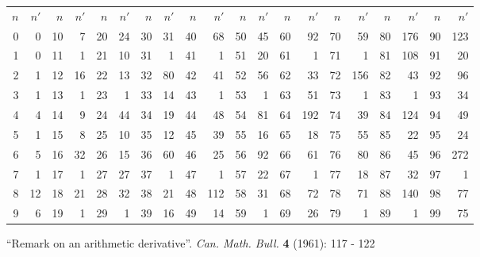 \documentclass[12pt]{article}
\begin{document}
\begin{tabular}{|r|r|r|r|r|r|r|r|r|r|r|r|r|r|r|r|r|r|r|r|}
$n$ & $n'$ & $n$ & $n'$ & $n$ & $n'$ & $n$ & $n'$ & $n$ & $n'$ & $n$ & $n'$ & $n$ & $n'$ & $n$ & $n'$ & $n$ & $n'$ & $n$ & $n'$ \\
0 & 0 & 10 & 7 & 20 & 24 & 30 & 31 & 40 & 68 & 50 & 45 & 60 & 92 & 70 & 59 & 80 & 176 & 90 & 123 \\
1 & 0 & 11 & 1 & 21 & 10 & 31 & 1 & 41 & 1 & 51 & 20 & 61 & 1 & 71 & 1 & 81 & 108 & 91 & 20 \\
2 & 1 & 12 & 16 & 22 & 13 & 32 & 80 & 42 & 41 & 52 & 56 & 62 & 33 & 72 & 156 & 82 & 43 & 92 & 96 \\
3 & 1 & 13 & 1 & 23 & 1 & 33 & 14 & 43 & 1 & 53 & 1 & 63 & 51 & 73 & 1 & 83 & 1 & 93 & 34 \\
4 & 4 & 14 & 9 & 24 & 44 & 34 & 19 & 44 & 48 & 54 & 81 & 64 & 192 & 74 & 39 & 84 & 124 & 94 & 49 \\
5 & 1 & 15 & 8 & 25 & 10 & 35 & 12 & 45 & 39 & 55 & 16 & 65 & 18 & 75 & 55 & 85 & 22 & 95 & 24 \\
6 & 5 & 16 & 32 & 26 & 15 & 36 & 60 & 46 & 25 & 56 & 92 & 66 & 61 & 76 & 80 & 86 & 45 & 96 & 272 \\
7 & 1 & 17 & 1 & 27 & 27 & 37 & 1 & 47 & 1 & 57 & 22 & 67 & 1 & 77 & 18 & 87 & 32 & 97 & 1 \\
8 & 12 & 18 & 21 & 28 & 32 & 38 & 21 & 48 & 112 & 58 & 31 & 68 & 72 & 78 & 71 & 88 & 140 & 98 & 77 \\
9 & 6 & 19 & 1 & 29 & 1 & 39 & 16 & 49 & 14 & 59 & 1 & 69 & 26 & 79 & 1 & 89 & 1 & 99 & 75 \\
\end{tabular}

\begin{thebibliography}{1}
 ``Remark on an arithmetic derivative''. {\em Can. Math. Bull.} {\bf 4} (1961): 117 - 122
\end{thebibliography}
\end{document}
